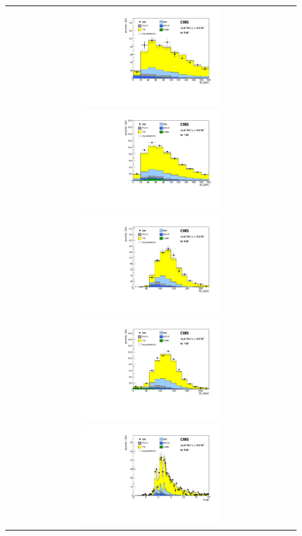 \begin{figure}[htp] 
\centering 
\begin{tabular}{c} 
\includegraphics[width=0.5\textwidth]{figures/topcontrol_mll_of_0j.pdf}
\includegraphics[width=0.5\textwidth]{figures/topcontrol_mll_of_1j.pdf} 
\\
\includegraphics[width=0.5\textwidth]{figures/topcontrol_mt_of_0j.pdf}
\includegraphics[width=0.5\textwidth]{figures/topcontrol_mt_of_1j.pdf} 
\\
\includegraphics[width=0.5\textwidth]{figures/topcontrol_tche_of_0j.pdf}

\end{tabular}
\end{figure}
